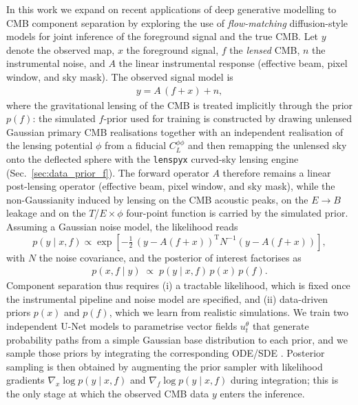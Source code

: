 \documentclass[11pt]{article}
\newcommand{\T}{\mathrm{T}}
\theoremstyle{definition}
\begin{document}
In this work we expand on recent applications of deep generative modelling to CMB component separation \cite{heurtel2023dust} by exploring the use of \emph{flow-matching} diffusion-style models \cite{ho2020ddpm,song2021sde,lipman2023flowmatching} for joint inference of the foreground signal and the true CMB. Let $y$ denote the observed map, $x$ the foreground signal, $f$ the \emph{lensed} CMB, $n$ the instrumental noise, and $A$ the linear instrumental response (effective beam, pixel window, and sky mask). The observed signal model is
\begin{align}
    y = A\,(f + x) + n,
    \label{eq:fwd_model}
\end{align}
where the gravitational lensing of the CMB is treated implicitly through the prior $p(f)$: the simulated $f$-prior used for training is constructed by drawing unlensed Gaussian primary CMB realisations together with an independent realisation of the lensing potential $\phi$ from a fiducial $C_L^{\phi\phi}$ and then remapping the unlensed sky onto the deflected sphere with the \texttt{lenspyx} curved-sky lensing engine \cite{reinecke2023ducc} (Sec.~\ref{sec:data_prior_f}). The forward operator $A$ therefore remains a linear post-lensing operator (effective beam, pixel window, and sky mask), while the non-Gaussianity induced by lensing on the CMB acoustic peaks, on the $E\!\to\!B$ leakage and on the $T$/$E\!\times\!\phi$ four-point function is carried by the simulated prior. Assuming a Gaussian noise model, the likelihood reads
\begin{equation}
    p(y\mid x,f) \propto \exp\!\left[-\tfrac{1}{2}\,(y-A(f+x))^\T N^{-1}(y-A(f+x))\right],
\end{equation}
with $N$ the noise covariance, and the posterior of interest factorises as
\begin{align}
    p(x,f\mid y) \;\propto\; p(y\mid x,f)\,p(x)\,p(f).
\end{align}
Component separation thus requires (i) a tractable likelihood, which is fixed once the instrumental pipeline and noise model are specified, and (ii) data-driven priors $p(x)$ and $p(f)$, which we learn from realistic simulations. We train two independent U-Net models to parametrise vector fields $u^\theta_t$ that generate probability paths from a simple Gaussian base distribution to each prior, and we sample those priors by integrating the corresponding ODE/SDE \cite{lipman2023flowmatching}. Posterior sampling is then obtained by augmenting the prior sampler with likelihood gradients $\nabla_x \log p(y\mid x,f)$ and $\nabla_f \log p(y\mid x,f)$ during integration; this is the only stage at which the observed CMB data $y$ enters the inference.
\end{document}
